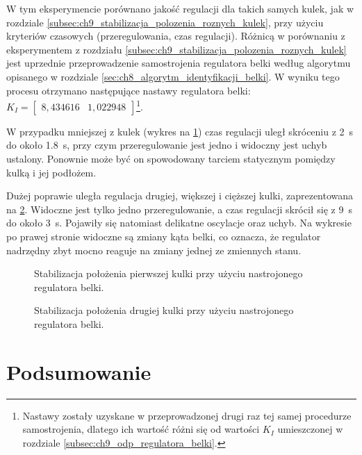 W tym eksperymencie porównano jakość regulacji dla takich samych kulek, jak w rozdziale \ref{subsec:ch9_stabilizacja_polozenia_roznych_kulek}, przy użyciu kryteriów czasowych (przeregulowania, czas regulacji). Różnicą w porównaniu z eksperymentem z rozdziału \ref{subsec:ch9_stabilizacja_polozenia_roznych_kulek} jest uprzednie przeprowadzenie samostrojenia regulatora belki według algorytmu opisanego w rozdziale \ref{sec:ch8_algorytm_identyfikacji_belki}. W wyniku tego procesu otrzymano następujące nastawy regulatora belki: $K_I = \begin{bmatrix}
8,434616 & 1,022948
\end{bmatrix}$\footnote{Nastawy zostały uzyskane w przeprowadzonej drugi raz tej samej procedurze samostrojenia, dlatego ich wartość różni się od wartości $K_I$ umieszczonej w rozdziale \ref{subsec:ch9_odp_regulatora_belki}.}.

W przypadku mniejszej z kulek (wykres na \cref{fig:stabilizacja_kulka1_nastrojona}) czas regulacji uległ skróceniu z \SI{2}{\second} do około \SI{1.8}{\second}, przy czym przeregulowanie jest jedno i widoczny jest uchyb ustalony. Ponownie może być on spowodowany tarciem statycznym pomiędzy kulką i jej podłożem.

Dużej poprawie uległa regulacja drugiej, większej i cięższej kulki, zaprezentowana na \cref{fig:stabilizacja_kulka2_nastrojona}. Widoczne jest tylko jedno przeregulowanie, a czas regulacji skrócił się z \SI{9}{\second} do około \SI{3}{\second}. Pojawiły się natomiast delikatne oscylacje oraz uchyb. Na wykresie po prawej stronie widoczne są zmiany kąta belki, co oznacza, że regulator nadrzędny zbyt mocno reaguje na zmiany jednej ze zmiennych stanu.

\begin{figure}[p]
    
    \caption{Stabilizacja położenia pierwszej kulki przy użyciu nastrojonego regulatora belki.}
    \label{fig:stabilizacja_kulka1_nastrojona}
\end{figure}
\begin{figure}[p]
    
    \caption{Stabilizacja położenia drugiej kulki przy użyciu nastrojonego regulatora belki.}
    \label{fig:stabilizacja_kulka2_nastrojona}
\end{figure}

\section{Podsumowanie}

